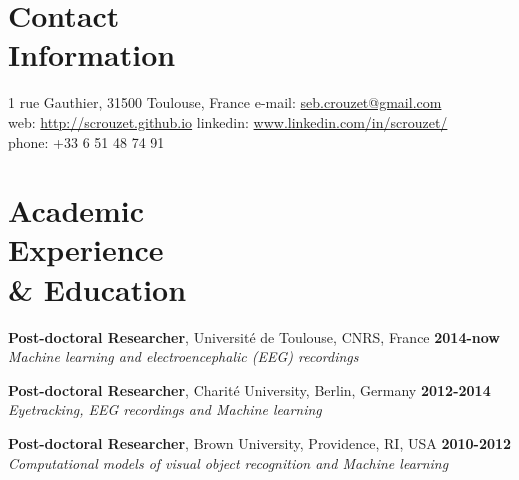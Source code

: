 \documentclass[margin,line]{resume}
\begin{document}

\begin{resume}

    
    \vspace{3mm}
    \section{\mysidestyle Contact\\Information}
    1 rue Gauthier, 31500 Toulouse, France
    \hfill e-mail: \href{mailto:seb.crouzet@gmail.com}{seb.crouzet@gmail.com} \\
    web: \url{http://scrouzet.github.io} \hfill linkedin: \url{www.linkedin.com/in/scrouzet/}\\
    \hfill phone: +33 6 51 48 74 91 \\ 

    \vspace{3mm}
    \section{\mysidestyle  Academic \\ Experience\\ \& Education  }
    
  	\textbf{Post-doctoral Researcher}, Université de Toulouse, CNRS, France \hfill \textbf{2014-now}\\
	\textsl{Machine learning and electroencephalic (EEG) recordings}
  	
	\vspace{-1.5mm}		
	\textbf{Post-doctoral Researcher}, Charité University, Berlin, Germany \hfill \textbf{2012-2014}\\
	\textsl{Eyetracking, EEG recordings and Machine learning}
  	
	\vspace{-1.5mm}		
	\textbf{Post-doctoral Researcher}, Brown University, Providence, RI, USA \hfill \textbf{2010-2012}\\
	\textsl{Computational models of visual object recognition and Machine learning}


\end{resume}
\end{document}
